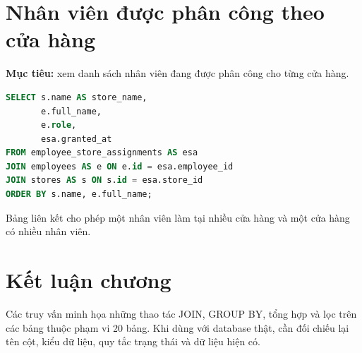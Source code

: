 \section{Nhân viên được phân công theo cửa hàng}
\textbf{Mục tiêu:} xem danh sách nhân viên đang được phân công cho từng cửa hàng.
\begin{lstlisting}[language=SQL]
SELECT s.name AS store_name,
       e.full_name,
       e.role,
       esa.granted_at
FROM employee_store_assignments AS esa
JOIN employees AS e ON e.id = esa.employee_id
JOIN stores AS s ON s.id = esa.store_id
ORDER BY s.name, e.full_name;
\end{lstlisting}
Bảng liên kết cho phép một nhân viên làm tại nhiều cửa hàng và một cửa hàng có nhiều nhân viên.

\section{Kết luận chương}
Các truy vấn minh họa những thao tác JOIN, GROUP BY, tổng hợp và lọc trên các bảng thuộc phạm vi 20 bảng. Khi dùng với database thật, cần đối chiếu lại tên cột, kiểu dữ liệu, quy tắc trạng thái và dữ liệu hiện có.
